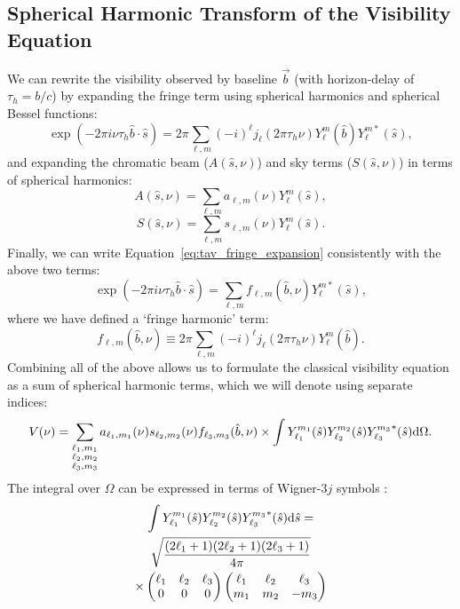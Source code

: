 \subsection{Spherical Harmonic Transform of the Visibility Equation}

We can rewrite the visibility observed by baseline $\vec{b}$ (with horizon-delay of $\tau_h = b/c$) by expanding the fringe term using spherical harmonics and spherical Bessel functions:
\begin{equation}
\exp\left(-2\pi i \nu \tau_h \hat{b}\cdot\hat{s}\right) = 2\pi \sum_{\ell, m} (-i)^{\ell} j_{\ell}(2\pi\tau_h\nu) Y^m_{\ell}(\hat{b}) Y^{m*}_{\ell}(\hat{s}),
\label{eq:tav_fringe_expansion}
\end{equation}
and expanding the chromatic beam ($A(\hat{s},\nu)$) and sky terms ($S(\hat{s},\nu)$) in terms of spherical harmonics:
\begin{equation}
A(\hat{s},\nu) = \sum_{\ell, m} a_{\ell, m}(\nu)Y^m_{\ell}(\hat{s}),
\end{equation} 
\begin{equation}
S(\hat{s},\nu) = \sum_{\ell, m} s_{\ell, m}(\nu)Y^m_{\ell}(\hat{s}).
\end{equation} 
Finally, we can write Equation~\ref{eq:tav_fringe_expansion} consistently with the above two terms:
\begin{equation}
\exp\left(-2\pi i \nu \tau_h \hat{b}\cdot\hat{s}\right) = \sum_{\ell, m} f_{\ell, m}(\hat{b},\nu) Y^{m*}_{\ell}(\hat{s}),
\end{equation}
where we have defined a `fringe harmonic' term:
\begin{equation}
f_{\ell, m}(\hat{b},\nu) \equiv 2\pi \sum_{\ell, m} (-i)^{\ell} j_{\ell}(2\pi\tau_h\nu) Y^m_{\ell}(\hat{b}).
\end{equation}
Combining all of the above allows us to formulate the classical visibility equation as a sum of spherical harmonic terms, which we will denote using separate indices:
\begin{equation}
V(\nu) = \sum_{\substack{\ell_1, m_1 \\ \ell_2, m_2 \\ \ell_3, m_3}} a_{\ell_1, m_1} (\nu) s_{\ell_2, m_2} (\nu) f_{\ell_3, m_3} (\hat{b}, \nu) \times \int Y_{\ell_1}^{m_1} (\hat{s}) Y_{\ell_2}^{m_2} (\hat{s}) {Y_{\ell_3}^{m_3}}^* (\hat{s}) {\rm d}\Omega.
\end{equation}
The integral over $\Omega$ can be expressed in terms of  Wigner-$3j$ symbols \citep{Wigner.51}:
\begin{multline}
\int Y_{\ell_1}^{m_1} (\hat{s}) Y_{\ell_2}^{m_2} (\hat{s}) {Y_{\ell_3}^{m_3}}^* (\hat{s}) {\rm d}{\hat{s}} = \\
\sqrt{\frac{(2\ell_1 + 1)(2\ell_2 + 1)(2\ell_3 + 1)}{4\pi}} \\
\times \begin{pmatrix}
\ell_1 & \ell_2 & \ell_3 \\
0 & 0 & 0
\end{pmatrix}
\begin{pmatrix}
\ell_1 & \ell_2 & \ell_3 \\
m_1 & m_2 & -m_3
\end{pmatrix}
\end{multline}

